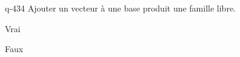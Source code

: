 \begin{truefalse}{q-434}
Ajouter un vecteur à une base produit une famille libre.
\item Vrai
\item* Faux
\end{truefalse}

